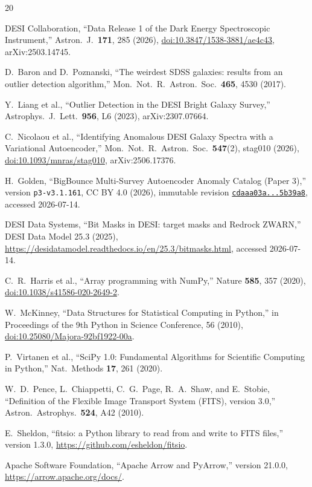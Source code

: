 \documentclass[twocolumn,linenumbers]{aastex702}
\begin{document}
\begin{thebibliography}{20}

DESI Collaboration, ``Data Release 1 of the Dark Energy Spectroscopic Instrument,''
Astron.\ J.\ \textbf{171}, 285 (2026),
\href{https://doi.org/10.3847/1538-3881/ae4c43}{doi:10.3847/1538-3881/ae4c43},
arXiv:2503.14745.

D.\ Baron and D.\ Poznanski, ``The weirdest SDSS galaxies: results from an outlier detection
algorithm,'' Mon.\ Not.\ R.\ Astron.\ Soc.\ \textbf{465}, 4530 (2017).

Y.\ Liang et al., ``Outlier Detection in the DESI Bright Galaxy Survey,''
Astrophys.\ J.\ Lett.\ \textbf{956}, L6 (2023), arXiv:2307.07664.

C.\ Nicolaou et al., ``Identifying Anomalous DESI Galaxy Spectra with a Variational Autoencoder,''
Mon.\ Not.\ R.\ Astron.\ Soc.\ \textbf{547}(2), stag010 (2026),
\href{https://doi.org/10.1093/mnras/stag010}{doi:10.1093/mnras/stag010},
arXiv:2506.17376.

H.\ Golden, ``BigBounce Multi-Survey Autoencoder Anomaly Catalog (Paper 3),''
version \texttt{p3-v3.1.161}, CC BY 4.0 (2026), immutable revision
\href{https://huggingface.co/datasets/bamfai/bigbounce-anomaly-catalog/tree/cdaaa03a72c69d86f011be128d93f261dc5b39a8}{\texttt{cdaaa03a...5b39a8}}, accessed 2026-07-14.

DESI Data Systems, ``Bit Masks in DESI: target masks and Redrock ZWARN,''
DESI Data Model 25.3 (2025),
\url{https://desidatamodel.readthedocs.io/en/25.3/bitmasks.html}, accessed 2026-07-14.

C.\ R.\ Harris et al., ``Array programming with NumPy,'' Nature \textbf{585}, 357 (2020),
\href{https://doi.org/10.1038/s41586-020-2649-2}{doi:10.1038/s41586-020-2649-2}.

W.\ McKinney, ``Data Structures for Statistical Computing in Python,'' in
Proceedings of the 9th Python in Science Conference, 56 (2010),
\href{https://doi.org/10.25080/Majora-92bf1922-00a}{doi:10.25080/Majora-92bf1922-00a}.

P.\ Virtanen et al., ``SciPy 1.0: Fundamental Algorithms for Scientific Computing in Python,''
Nat.\ Methods \textbf{17}, 261 (2020).

W.\ D.\ Pence, L.\ Chiappetti, C.\ G.\ Page, R.\ A.\ Shaw, and E.\ Stobie,
``Definition of the Flexible Image Transport System (FITS), version 3.0,''
Astron.\ Astrophys.\ \textbf{524}, A42 (2010).

E.\ Sheldon, ``fitsio: a Python library to read from and write to FITS files,''
version 1.3.0, \url{https://github.com/esheldon/fitsio}.

Apache Software Foundation, ``Apache Arrow and PyArrow,'' version 21.0.0,
\url{https://arrow.apache.org/docs/}.

\end{thebibliography}
\end{document}
